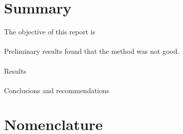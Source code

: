 \chapter{Summary}
	\noindent
	The objective of this report is \\
	\\
	Preliminary results found that the method was not good.\\ 
	\\
	Results\\
	\\
	Conclusions and recommendations\\

\chapter{Nomenclature}


